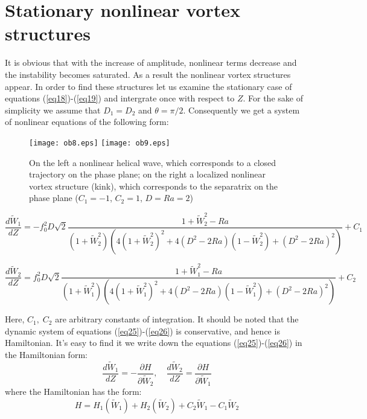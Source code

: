 \documentclass [12pt]{article}
\begin{document}
\section{Stationary nonlinear vortex structures}

It is obvious that with the increase of amplitude, nonlinear terms decrease and the instability becomes saturated. As a  result the nonlinear vortex structures appear. In order to find these structures let us examine the stationary case of equations  (\ref{eq18})-(\ref{eq19}) and intergrate once with respect to $Z$. For the sake of simplicity we assume that $D_1=D_2$ and $\theta=\pi/2$. Consequently we get a system of nonlinear equations of the following form:

\begin{figure}
  \centering
    \texttt{[image: ob8.eps]}
		\texttt{[image: ob9.eps]}\\
  \caption{On the left a nonlinear helical wave, which corresponds to a closed trajectory on the phase plane; on the right a localized nonlinear vortex structure (kink), which corresponds to the separatrix on the phase plane ($C_{1} =-1$, $C_{2} =1$, $D=Ra=2$)}\label{fg6}
\end{figure}

\begin{equation}\label{eq25}
\frac{{d\widetilde W_1 }}{{dZ}} =  - f_0^2 D\sqrt 2 \frac{{1 + \widetilde W_2^2  - Ra}}{{(1 + \widetilde W_2^2 )(4(1 + \widetilde W_2^2 )^2  + 4(D^2  - 2Ra)(1 - \widetilde W_2^2 ) + (D^2  - 2Ra)^2 )}} + C_1
\end{equation}

\begin{equation}\label{eq26}
\frac{{d\widetilde W_2 }}{{dZ}} =   f_0^2 D\sqrt 2 \frac{{1 + \widetilde W_1^2  - Ra}}{{(1 + \widetilde W_1^2 )(4(1 + \widetilde W_1^2 )^2  + 4(D^2  - 2Ra)(1 - \widetilde W_1^2 ) + (D^2  - 2Ra)^2 )}} + C_2
\end{equation}

Here,  $C_{1},\; C_{2} $ are arbitrary constants of integration. It should be noted that the dynamic system of equations (\ref{eq25})-(\ref{eq26}) is conservative, and hence is Hamiltonian. It's easy to find it we write down the equations (\ref{eq25})-(\ref{eq26}) in the Hamiltonian form:
\[\frac{{d\widetilde W_1 }}{{dZ}} =  - \frac{{\partial H}}{{\partial \widetilde W_2 }}, \quad \frac{{d\widetilde W_2 }}{{dZ}} =   \frac{{\partial H}}{{\partial \widetilde W_1 }} \]
where the Hamiltonian has the form:
\begin{equation}\label{eq27}
H = H_1 (\widetilde W_1 ) + H_2 (\widetilde W_2 ) + C_2 \widetilde W_1  - C_1 \widetilde W_2
\end{equation}
\end{document}
